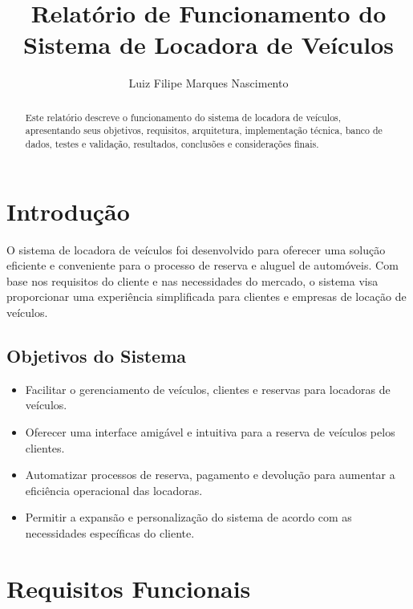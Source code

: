\documentclass[12pt]{article}
\begin{document}
 

\title{Relatório de Funcionamento do Sistema de Locadora de Veículos}
\author{Luiz Filipe Marques Nascimento}

\maketitle

\begin{abstract}
Este relatório descreve o funcionamento do sistema de locadora de veículos, apresentando seus objetivos, requisitos, arquitetura, implementação técnica, banco de dados, testes e validação, resultados, conclusões e considerações finais.
\end{abstract}
     
\section{Introdução}

O sistema de locadora de veículos foi desenvolvido para oferecer uma solução eficiente e conveniente para o processo de reserva e aluguel de automóveis. Com base nos requisitos do cliente e nas necessidades do mercado, o sistema visa proporcionar uma experiência simplificada para clientes e empresas de locação de veículos.

\subsection{Objetivos do Sistema}

\begin{itemize}
    \item Facilitar o gerenciamento de veículos, clientes e reservas para locadoras de veículos.
    \item Oferecer uma interface amigável e intuitiva para a reserva de veículos pelos clientes.
    \item Automatizar processos de reserva, pagamento e devolução para aumentar a eficiência operacional das locadoras.
    \item Permitir a expansão e personalização do sistema de acordo com as necessidades específicas do cliente.
\end{itemize}

\section{Requisitos Funcionais}
\end{document}
